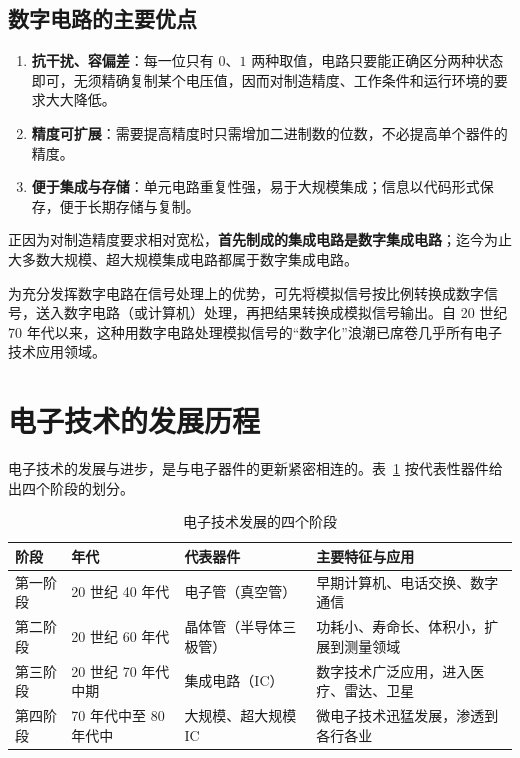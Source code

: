 \subsection{数字电路的主要优点}
\begin{enumerate}
    \item \textbf{抗干扰、容偏差}：每一位只有 $0$、$1$ 两种取值，电路只要能正确区分两种状态即可，无须精确复制某个电压值，因而对制造精度、工作条件和运行环境的要求大大降低。
    \item \textbf{精度可扩展}：需要提高精度时只需增加二进制数的位数，不必提高单个器件的精度。
    \item \textbf{便于集成与存储}：单元电路重复性强，易于大规模集成；信息以代码形式保存，便于长期存储与复制。
\end{enumerate}
正因为对制造精度要求相对宽松，\textbf{首先制成的集成电路是数字集成电路}；迄今为止大多数大规模、超大规模集成电路都属于数字集成电路。

为充分发挥数字电路在信号处理上的优势，可先将模拟信号按比例转换成数字信号，送入数字电路（或计算机）处理，再把结果转换成模拟信号输出。自 20 世纪 70 年代以来，这种用数字电路处理模拟信号的``数字化''浪潮已席卷几乎所有电子技术应用领域。

\section{电子技术的发展历程}
电子技术的发展与进步，是与电子器件的更新紧密相连的。表~\ref{tab:dev_history} 按代表性器件给出四个阶段的划分。

\begin{table}[!htbp]
    \centering
    \caption{电子技术发展的四个阶段}
    \label{tab:dev_history}
    \begin{tabular}{@{}llll@{}}
        \toprule
        阶段 & 年代 & 代表器件 & 主要特征与应用 \\
        \midrule
        第一阶段 & 20 世纪 40 年代 & 电子管（真空管） & 早期计算机、电话交换、数字通信 \\
        第二阶段 & 20 世纪 60 年代 & 晶体管（半导体三极管） & 功耗小、寿命长、体积小，扩展到测量领域 \\
        第三阶段 & 20 世纪 70 年代中期 & 集成电路（IC） & 数字技术广泛应用，进入医疗、雷达、卫星 \\
        第四阶段 & 70 年代中至 80 年代中 & 大规模、超大规模 IC & 微电子技术迅猛发展，渗透到各行各业 \\
        \bottomrule
    \end{tabular}
\end{table}

